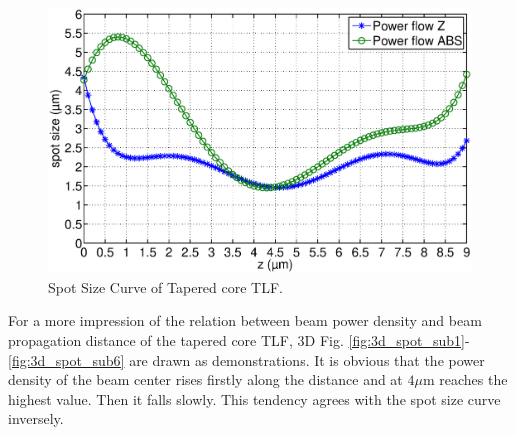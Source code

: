 \begin{figure}[!ht]
		\centering
		\includegraphics[width=0.7 \textwidth]{bilder/Tapered_core_spot_curve}
		\caption{Spot Size Curve of Tapered core TLF.}
 		\label{fig:Tapered_core_spot_curve}	
\end{figure}
For a more impression of the relation between beam power density and beam propagation distance of the tapered core TLF, 3D Fig. \ref{fig:3d_spot_sub1}-\ref{fig:3d_spot_sub6} are drawn as demonstrations. It is obvious that the power density of the beam center rises firstly along the distance and at $4\mu$m reaches the highest value. Then it falls slowly. This tendency agrees with the spot size curve inversely. \\

